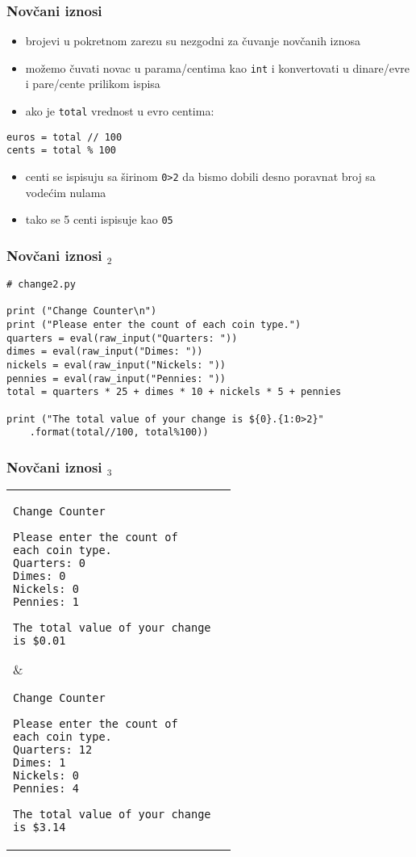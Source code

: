 \documentclass[utf8,compress]{beamer}
\begin{document}
\begin{frame}[fragile]
  \frametitle{Novčani iznosi}
  \begin{itemize}
    \item brojevi u pokretnom zarezu su nezgodni za čuvanje novčanih iznosa
    \item možemo čuvati novac u parama/centima kao \texttt{int} i konvertovati u dinare/evre i pare/cente prilikom ispisa
    \item ako je \texttt{total} vrednost u evro centima:
  \end{itemize}
\begin{verbatim}
euros = total // 100
cents = total % 100
\end{verbatim}
  \begin{itemize}
    \item centi se ispisuju sa širinom \texttt{0>2} da bismo dobili desno poravnat broj sa vodećim nulama
    \item tako se 5 centi ispisuje kao \texttt{05}
  \end{itemize}
\end{frame}

\begin{frame}[fragile]
  \frametitle{Novčani iznosi $_2$}
\begin{verbatim}
# change2.py

print ("Change Counter\n")
print ("Please enter the count of each coin type.")
quarters = eval(raw_input("Quarters: "))
dimes = eval(raw_input("Dimes: "))
nickels = eval(raw_input("Nickels: "))
pennies = eval(raw_input("Pennies: "))
total = quarters * 25 + dimes * 10 + nickels * 5 + pennies 

print ("The total value of your change is ${0}.{1:0>2}"
    .format(total//100, total%100))
\end{verbatim}
\end{frame}

\begin{frame}[fragile,shrink=20]
  \frametitle{Novčani iznosi $_3$}
\begin{center}
\begin{tabular}{p{6cm}|p{6cm}}
\begin{verbatim}
Change Counter

Please enter the count of
each coin type.
Quarters: 0
Dimes: 0
Nickels: 0
Pennies: 1

The total value of your change
is $0.01
\end{verbatim}
&
\begin{verbatim}
Change Counter

Please enter the count of
each coin type.
Quarters: 12
Dimes: 1
Nickels: 0
Pennies: 4

The total value of your change
is $3.14
\end{verbatim}
\end{tabular}
\end{center}
\end{frame}
\end{document}
